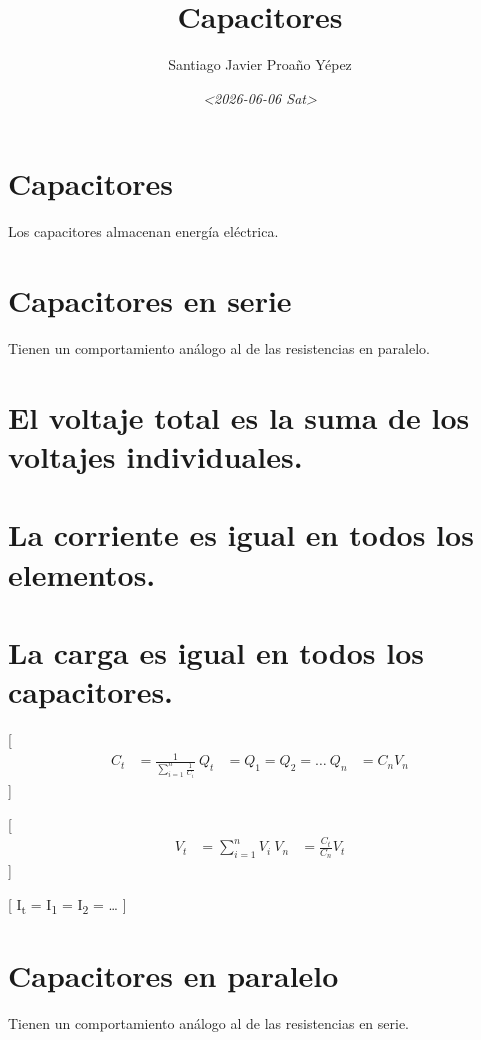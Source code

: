 \documentclass[11pt]{article}
\author{Santiago Javier Proaño Yépez}
\date{\textit{<2026-06-06 Sat>}}
\title{Capacitores}
\begin{document}
\maketitle
\tableofcontents

\section{Capacitores}
\label{sec:orgba1941e}

Los capacitores almacenan energía eléctrica.

\section{Capacitores en serie}
\label{sec:orgd667b6d}

Tienen un comportamiento análogo al de las resistencias en paralelo.

\section{El voltaje total es la suma de los voltajes individuales.}
\label{sec:orgf1ed71e}
\section{La corriente es igual en todos los elementos.}
\label{sec:org4ec41a2}
\section{La carga es igual en todos los capacitores.}
\label{sec:org907fb4e}

[
\begin{align}
C_t &= \frac{1}{\sum_{i=1}^{n}\frac{1}{C_i}} \
Q_t &= Q_1 = Q_2 = \dots \
Q_n &= C_nV_n
\end{align}
]

[
\begin{align}
V_t &= \sum_{i=1}^{n}V_i \
V_n &= \frac{C_t}{C_n}V_t
\end{align}
]

[
I\textsubscript{t} = I\textsubscript{1} = I\textsubscript{2} = \dots{}
]

\section{Capacitores en paralelo}
\label{sec:org77a2aa7}

Tienen un comportamiento análogo al de las resistencias en serie.
\end{document}

